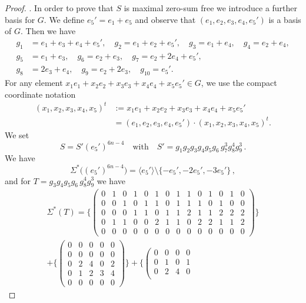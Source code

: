 \documentclass[a4paper, 10pt]{amsart}
\theoremstyle{plain}
\theoremstyle{definition}
\numberwithin{equation}{section}
\begin{document}
{\begin{proof}
. In order to prove that $S$ is maximal zero-sum free 
we  introduce a further basis for $G$. We define
$e_5' = e_1 + e_5$ and observe that 
$(e_1,e_2,e_3,e_4,e_5')$ is  a basis of $G$. Then we have
\begin{align*}
	g_1&=e_1+e_3+e_4+e_5',\quad g_2=e_1+e_2+e_5',\quad g_3=e_1+e_4,\quad g_4=e_2+e_4,\\
	g_5&=e_1+e_3,\quad g_6=e_2+e_3,\quad g_7=e_2+2e_4+e_5',\\
	g_8&=2e_3+e_4,\quad g_9=e_2+2e_3,\quad g_{10}=e_5'.
\end{align*}
For any element $x_1e_1+x_2e_2+x_3e_3+x_4e_4+x_5e_5' \in G$, we use the compact coordinate notation
\begin{align*}
	(x_1,x_2,x_3,x_4,x_5)^t &:= x_1e_1+x_2e_2+x_3e_3+x_4e_4+x_5e_5'\\
	&=(e_1,e_2,e_3,e_4,e_5')\cdot (x_1,x_2,x_3,x_4,x_5)^t.
\end{align*}
We set
\[
S = S'  (e_5')^{6n-4} \quad \text{with} \quad S' = g_1 g_2 g_3 g_4 g_5 g_6 \, g_7^3 g_8^4 g_9^3 \,.
\]
We have 
\[
\Sigma^*\bigl((e_5')^{6n-4}\bigr) = \langle e_5' \rangle \setminus \{-e_5',-2e_5',-3e_5'\} \,,
\]
and for 
$T = g_3 g_4 g_5 g_6 \, g_8^4 g_9^3$ we have
\begin{align*}
	\Sigma^*(T)=
	\{ \left(\begin{array}{l|l|l|l|l|l|l|l|l|l|l|l|l|l}
		0 & 1 & 0 & 1 & 0 & 1 & 0 & 1 & 1 & 0 & 1 & 0 & 1 & 0\\
		0 & 0 & 1 & 0 & 1 & 1 & 0 & 1 & 1 & 1 & 0 & 1 & 0 & 0\\
		0 & 0 & 0 & 1 & 1 & 0 & 1 & 1 & 2 & 1 & 1 & 2 & 2 & 2\\
		0 & 1 & 1 & 0 & 0 & 2 & 1 & 1 & 0 & 2 & 2 & 1 & 1 & 2\\
		0 & 0 & 0 & 0 & 0 & 0 & 0 & 0 & 0 & 0 & 0 & 0 & 0 & 0
	\end{array}\right)
	\} \\
	+  \{
	\left(\begin{array}{l|l|l|l|l}
		0 & 0 & 0 & 0 & 0\\
		0 & 0 & 0 & 0 & 0\\
		0 & 2 & 4 & 0 & 2\\
		0 & 1 & 2 & 3 & 4\\
		0 & 0 & 0 & 0 & 0
	\end{array}\right)
	\}+  \{
	\left(\begin{array}{l|l|l|l}
		0 & 0 & 0 & 0\\
		0 & 1 & 0 & 1\\
		0 & 2 & 4 & 0\\

\end{array}
\end{align*}
\end{proof}}
\end{document}
